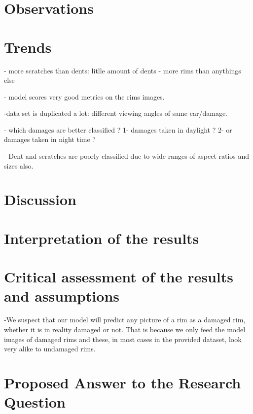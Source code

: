 \documentclass[lang=english,inputenc=utf8,fontsize=10pt]{ldvarticle}
\begin{document}
\lipsum[13]

\section*{Observations}

\lipsum[14]

\section*{Trends}

- more scratches than dents: litlle amount of dents
- more rims than anythings else

- model scores very good metrics on the rims images.

-data set is duplicated a lot: different viewing angles of same car/damage.

- which damages are better classified ?
1- damages taken in daylight ?
2- or damages taken in night time ?

- Dent and scratches are poorly classified due to wide ranges of aspect ratios and sizes also.
\newpage

\section{Discussion}

\lipsum[16]

\section*{Interpretation of the results}

\lipsum[8]

\section*{Critical assessment of the results and assumptions}

-We suspect that our model will predict any picture of a rim as a damaged rim, whether it is in reality damaged or not. That is because we only feed the model images of damaged rims and these, in most cases in the provided dataset, look very alike to undamaged rims.



\section*{Proposed Answer to the Research Question}
\end{document}
